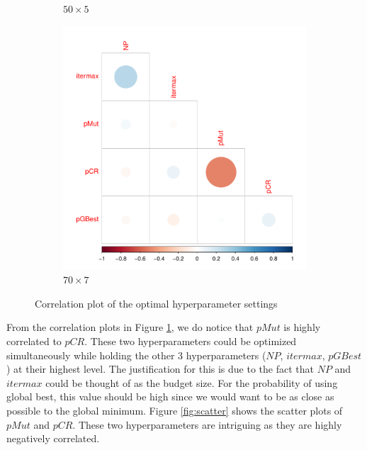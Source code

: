 \documentclass [PhD] {package/uclathes}
\begin{document}
\begin{figure}
\begin{subfigure}[b]{0.3\textwidth}
\caption{$50\times 5$}
\end{subfigure}
\begin{subfigure}[b]{0.3\textwidth}
\centering
\includegraphics{chapters/RSO/pdfs/corplot70_1}
\caption{$70\times 7$}
\end{subfigure}
\caption{Correlation plot of the optimal hyperparameter settings}
\label{fig:correlation}
\end{figure}

From the correlation plots in Figure \ref{fig:correlation}, we do notice that  $pMut$ is highly correlated to $pCR$. These two hyperparameters could be optimized simultaneously while holding the other 3 hyperparameters ($NP$, $itermax$, $pGBest$) at their highest level. The justification for this is due to the fact that $NP$ and  $itermax$ could be thought of as the budget size. For the probability of using global best, this value should be high since we would want to be as close as possible to the global minimum. Figure \ref{fig:scatter} shows the scatter plots of $pMut$ and $pCR$. These two hyperparameters are intriguing as they are highly negatively correlated. %
\end{document}
